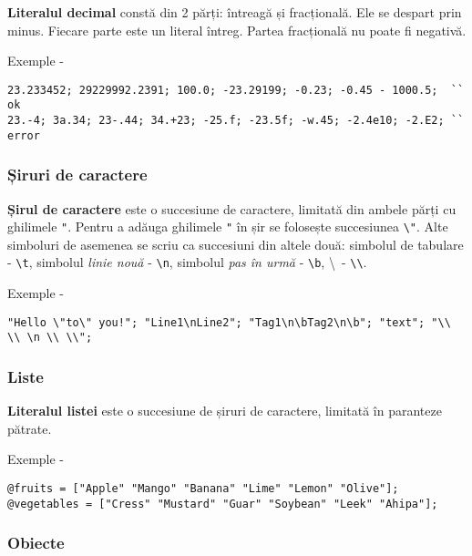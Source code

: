 {\bf Literalul decimal} constă din 2 părți: întreagă și fracțională. Ele se despart prin minus. Fiecare parte este un literal întreg. Partea fracțională nu poate fi negativă.

\noindent Exemple -
\begin{lstlisting}[numbers=none]
23.233452; 29229992.2391; 100.0; -23.29199; -0.23; -0.45 - 1000.5;  `` ok
23.-4; 3а.34; 23-.44; 34.+23; -25.f; -23.5f; -w.45; -2.4e10; -2.E2; `` error
\end{lstlisting}

\subsubsection{Șiruri de caractere}

{\bf Șirul de caractere} este o succesiune de caractere, limitată din ambele părți cu ghilimele \lstinline|"|. Pentru a adăuga ghilimele \lstinline|"| în șir se folosește succesiunea \lstinline|\"|. Alte simboluri de asemenea se scriu ca succesiuni din altele două: simbolul de tabulare - \lstinline|\t|, simbolul {\it linie nouă} - \lstinline|\n|, simbolul {\it pas în urmă} - \lstinline|\b|, \textbackslash \ - \lstinline|\\|.

\noindent Exemple -
\begin{lstlisting}[numbers=none]
"Hello \"to\" you!"; "Line1\nLine2"; "Tag1\n\bTag2\n\b"; "text"; "\\ \\ \n \\ \\";
\end{lstlisting}

\subsubsection{Liste}

{\bf Literalul listei} este o succesiune de șiruri de caractere, limitată în paranteze pătrate.

\noindent Exemple -
\begin{lstlisting}[numbers=none]
@fruits = ["Apple" "Mango" "Banana" "Lime" "Lemon" "Olive"];
@vegetables = ["Cress" "Mustard" "Guar" "Soybean" "Leek" "Ahipa"];
\end{lstlisting}

\subsubsection{Obiecte}

